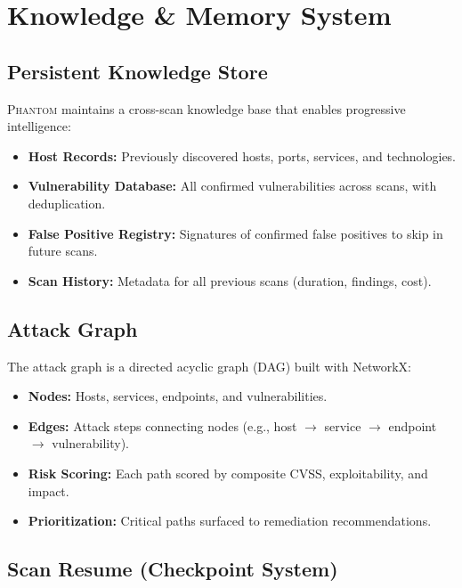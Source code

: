 \documentclass[12pt,a4paper,twoside]{report}
\makeatletter
\newcommand{\phantom@}{\textsc{Phantom}}
\makeatother
\begin{document}
\chapter{Knowledge \& Memory System}
\label{ch:knowledge}

\section{Persistent Knowledge Store}

\phantom@{} maintains a cross-scan knowledge base that enables progressive intelligence:

\begin{itemize}
    \item \textbf{Host Records:} Previously discovered hosts, ports, services, and technologies.
    \item \textbf{Vulnerability Database:} All confirmed vulnerabilities across scans, with deduplication.
    \item \textbf{False Positive Registry:} Signatures of confirmed false positives to skip in future scans.
    \item \textbf{Scan History:} Metadata for all previous scans (duration, findings, cost).
\end{itemize}

\section{Attack Graph}

The attack graph is a directed acyclic graph (DAG) built with NetworkX:

\begin{itemize}
    \item \textbf{Nodes:} Hosts, services, endpoints, and vulnerabilities.
    \item \textbf{Edges:} Attack steps connecting nodes (e.g., host $\rightarrow$ service $\rightarrow$ endpoint $\rightarrow$ vulnerability).
    \item \textbf{Risk Scoring:} Each path scored by composite CVSS, exploitability, and impact.
    \item \textbf{Prioritization:} Critical paths surfaced to remediation recommendations.
\end{itemize}

\section{Scan Resume (Checkpoint System)}
\end{document}
